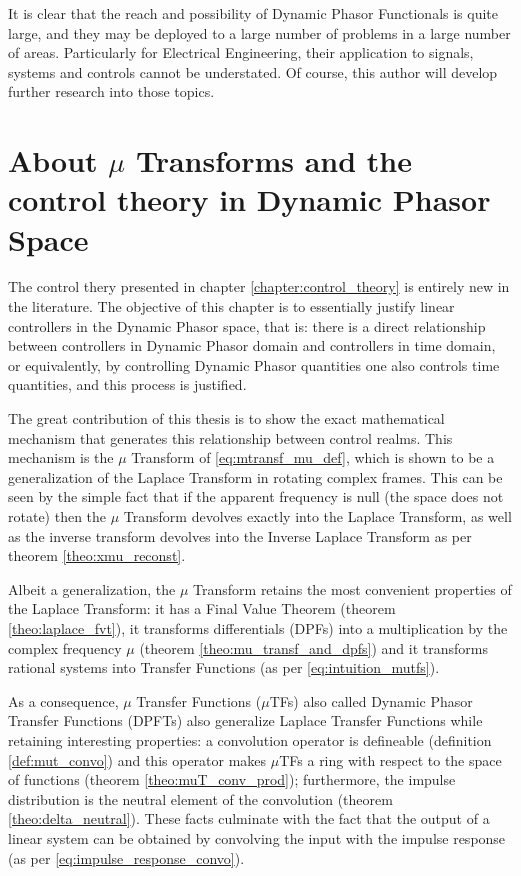 	It is clear that the reach and possibility of Dynamic Phasor Functionals is quite large, and they may be deployed to a large number of problems in a large number of areas. Particularly for Electrical Engineering, their application to signals, systems and controls cannot be understated. Of course, this author will develop further research into those topics.

\section{About $\mu$ Transforms and the control theory in Dynamic Phasor Space}

	The control thery presented in chapter \ref{chapter:control_theory} is entirely new in the literature. The objective of this chapter is to essentially justify linear controllers in the Dynamic Phasor space, that is: there is a direct relationship between controllers in Dynamic Phasor domain and controllers in time domain, or equivalently, by controlling Dynamic Phasor quantities one also controls time quantities, and this process is justified.

	The great contribution of this thesis is to show the exact mathematical mechanism that generates this relationship between control realms. This mechanism is the $\mu$ Transform of \eqref{eq:mtransf_mu_def}, which is shown to be a generalization of the Laplace Transform in rotating complex frames. This can be seen by the simple fact that if the apparent frequency is null (the space does not rotate) then the $\mu$ Transform devolves exactly into the Laplace Transform, as well as the inverse transform devolves into the Inverse Laplace Transform as per theorem \ref{theo:xmu_reconst}.

	Albeit a generalization, the $\mu$ Transform retains the most convenient properties of the Laplace Transform: it has a Final Value Theorem (theorem \ref{theo:laplace_fvt}), it transforms differentials (DPFs) into a multiplication by the complex frequency $\mu$ (theorem \ref{theo:mu_transf_and_dpfs}) and it transforms rational systems into Transfer Functions (as per \eqref{eq:intuition_mutfs}).

	As a consequence, $\mu$ Transfer Functions ($\mu$TFs) also called Dynamic Phasor Transfer Functions (DPFTs) also generalize Laplace Transfer Functions while retaining interesting properties: a convolution operator is defineable (definition \ref{def:mut_convo}) and this operator makes $\mu$TFs a ring with respect to the space of functions (theorem \ref{theo:muT_conv_prod}); furthermore, the impulse distribution is the neutral element of the convolution (theorem \ref{theo:delta_neutral}). These facts culminate with the fact that the output of a linear system can be obtained by convolving the input with the impulse response (as per \ref{eq:impulse_response_convo}).

